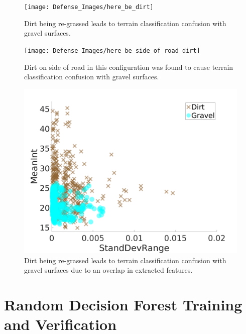 \documentclass[numbered,pdftex]{ohio-etd}
\begin{document}
{{{		\begin{figure}[H]
			\centering
			\texttt{[image: Defense\_Images/here\_be\_dirt]}
			\caption[Re-grassed Dirt]{Dirt being re-grassed leads to terrain classification confusion with gravel surfaces.}
			\label{fig:here_be_dirt}
		\end{figure}
		
	
		\begin{figure}[H]
			\centering
			\texttt{[image: Defense\_Images/here\_be\_side\_of\_road\_dirt]}
			\caption[Dirt on Side of Road]{Dirt on side of road in this configuration was found to cause terrain classification confusion with gravel surfaces.}
			\label{fig:here_be_side_of_road_dirt}
		\end{figure}
		
		\begin{figure}[H]
			\centering
			\includegraphics[width=0.65\linewidth]{Defense_Images/dirt_v_gravel2}
			\caption[Dirt vs Gravel]{Dirt being re-grassed leads to terrain classification confusion with gravel surfaces due to an overlap in extracted features. }
			\label{fig:dirt_v_gravel2}
		\end{figure}
	
	} %
		
	
	\section{Random Decision Forest Training and Verification}\label{sec:rdf_train_verify}{
		
}}}
\end{document}
